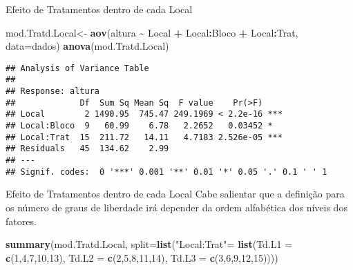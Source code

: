 \documentclass[
  ignorenonframetext,
]{beamer}
\newenvironment{Shaded}{\begin{snugshade}}{\end{snugshade}}
\newcommand{\AttributeTok}[1]{\textcolor[rgb]{0.13,0.29,0.53}{#1}}
\newcommand{\DecValTok}[1]{\textcolor[rgb]{0.00,0.00,0.81}{#1}}
\newcommand{\FunctionTok}[1]{\textcolor[rgb]{0.13,0.29,0.53}{\textbf{#1}}}
\newcommand{\NormalTok}[1]{#1}
\newcommand{\OtherTok}[1]{\textcolor[rgb]{0.56,0.35,0.01}{#1}}
\newcommand{\SpecialCharTok}[1]{\textcolor[rgb]{0.81,0.36,0.00}{\textbf{#1}}}
\newcommand{\StringTok}[1]{\textcolor[rgb]{0.31,0.60,0.02}{#1}}
\begin{document}
\begin{frame}[fragile]{Efeito de Tratamentos dentro de cada Local}
\protect\hypertarget{efeito-de-tratamentos-dentro-de-cada-local-1}{}
\begin{Shaded}
\begin{Highlighting}[]
\NormalTok{mod.Tratd.Local}\OtherTok{\textless{}{-}} \FunctionTok{aov}\NormalTok{(altura }\SpecialCharTok{\textasciitilde{}}\NormalTok{ Local }\SpecialCharTok{+} 
\NormalTok{                        Local}\SpecialCharTok{:}\NormalTok{Bloco }\SpecialCharTok{+} 
\NormalTok{                        Local}\SpecialCharTok{:}\NormalTok{Trat, }
                      \AttributeTok{data=}\NormalTok{dados)}
\FunctionTok{anova}\NormalTok{(mod.Tratd.Local)}
\end{Highlighting}
\end{Shaded}

\begin{verbatim}
## Analysis of Variance Table
## 
## Response: altura
##             Df  Sum Sq Mean Sq  F value    Pr(>F)    
## Local        2 1490.95  745.47 249.1969 < 2.2e-16 ***
## Local:Bloco  9   60.99    6.78   2.2652   0.03452 *  
## Local:Trat  15  211.72   14.11   4.7183 2.526e-05 ***
## Residuals   45  134.62    2.99                       
## ---
## Signif. codes:  0 '***' 0.001 '**' 0.01 '*' 0.05 '.' 0.1 ' ' 1
\end{verbatim}
\end{frame}

\begin{frame}[fragile]{Efeito de Tratamentos dentro de cada Local}
\protect\hypertarget{efeito-de-tratamentos-dentro-de-cada-local-2}{}
Cabe salientar que a definição para os número de graus de liberdade irá
depender da ordem alfabética dos níveis dos fatores.

\begin{Shaded}
\begin{Highlighting}[]
\FunctionTok{summary}\NormalTok{(mod.Tratd.Local, }
        \AttributeTok{split=}\FunctionTok{list}\NormalTok{(}\StringTok{"Local:Trat"}\OtherTok{=}
                     \FunctionTok{list}\NormalTok{(}\AttributeTok{Td.L1 =} \FunctionTok{c}\NormalTok{(}\DecValTok{1}\NormalTok{,}\DecValTok{4}\NormalTok{,}\DecValTok{7}\NormalTok{,}\DecValTok{10}\NormalTok{,}\DecValTok{13}\NormalTok{),}
                          \AttributeTok{Td.L2 =} \FunctionTok{c}\NormalTok{(}\DecValTok{2}\NormalTok{,}\DecValTok{5}\NormalTok{,}\DecValTok{8}\NormalTok{,}\DecValTok{11}\NormalTok{,}\DecValTok{14}\NormalTok{), }
                          \AttributeTok{Td.L3 =} \FunctionTok{c}\NormalTok{(}\DecValTok{3}\NormalTok{,}\DecValTok{6}\NormalTok{,}\DecValTok{9}\NormalTok{,}\DecValTok{12}\NormalTok{,}\DecValTok{15}\NormalTok{))))}
\end{Highlighting}
\end{Shaded}
\end{frame}
\end{document}
